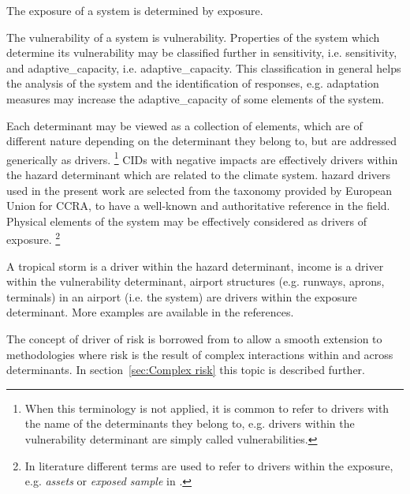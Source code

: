 The \gls{exposure} of a system is determined by \glsdesc{exposure}.

The \gls{vulnerability} of a system is \glsdesc{vulnerability}. Properties of the system which determine its \gls{vulnerability} may be classified further in \gls{sensitivity}, i.e. \glsdesc{sensitivity}, and \gls{adaptive_capacity}, i.e. \glsdesc{adaptive_capacity}. This classification in general helps the analysis of the system and the identification of responses, e.g. \gls{adaptation} measures may increase the \gls{adaptive_capacity} of some elements of the system.

Each \gls{determinant} may be viewed as a collection of elements, which are of different nature depending on the \gls{determinant} they belong to, but are addressed generically as \glspl{driver}.%
\footnote{When this terminology is not applied, it is common to refer to \glspl{driver} with the name of the \glspl{determinant} they belong to, e.g. drivers within the \gls{vulnerability} determinant are simply called vulnerabilities.}
\Glspl{CID} with negative \glspl{impact} are effectively \glspl{driver} within the \gls{hazard} \gls{determinant} which are related to the climate system. \Gls{hazard} \glspl{driver} used in the present work are selected from the taxonomy provided by European Union for \gls{CCRA}, to have a well-known and authoritative reference in the field.\cite[177]{2024EU20212139}
Physical elements of the system may be effectively considered as \glspl{driver} of \gls{exposure}.%
\footnote{In literature different terms are used to refer to \glspl{driver} within the \gls{exposure}, e.g. \emph{assets} or \emph{exposed sample} in \cite{2022DeVivoRiskAssessment}.}
\begin{example}
  A tropical storm is a \gls{driver} within the \gls{hazard} \gls{determinant},\cite[15]{2017GIZRiskSupplement} income is a \gls{driver} within the \gls{vulnerability} \gls{determinant},\cite[493]{2021SimpsonAFramework} airport structures (e.g. runways, aprons, terminals) in an airport (i.e. the system) are \glspl{driver} within the \gls{exposure} \gls{determinant}.\cite[551]{2022DeVivoRiskAssessment} More examples are available in the references.
\end{example}
The concept of \gls{driver} of \gls{risk} is borrowed from \cite{2021SimpsonAFramework} to allow a smooth extension to methodologies where \gls{risk} is the result of complex interactions within and across \glspl{determinant}. In section~\ref{sec:Complex risk} this topic is described further.

